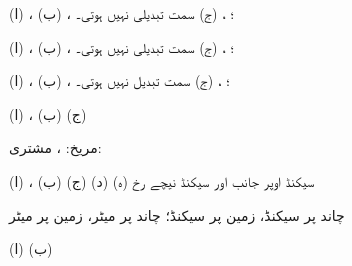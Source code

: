 \begin {description}\setlength {\parskip }{0pt} \setlength {\itemsep }{0pt plus 1pt}
\item [
\protect ۱)
]
(ا) ،  (ب) ، ؛ ،  (ج) سمت تبدیلی نہیں ہوتی۔ 
\item [
\protect ۳)
]
 (ا) ،  (ب) ، ؛ ،  (ج) سمت تبدیلی نہیں ہوتی۔ 
\item [
\protect ۵)
]
 (ا) ،  (ب) ، ؛ ،  (ج) سمت تبدیل نہیں ہوتی۔ 
\item [
\protect ۷)
]
 (ا) ،  (ب)  (ج)  
\item [
\protect ۹)
]
 مریخ: ، مشتری:  
\item [
\protect ۱۱)
]
 (ا) ،  (ب)  (ج)  (د)  سیکنڈ اوپر جانب اور  سیکنڈ نیچے رخ (ہ)  
\item [
\protect ۱۳)
]
 چاند پر  سیکنڈ، زمین پر  سیکنڈ؛ چاند پر  میٹر، زمین پر  میٹر 
\item [
\protect ۱۵)
]
 (ا)  (ب)  
\item [
\protect ۱۷)
]

\end{description}
